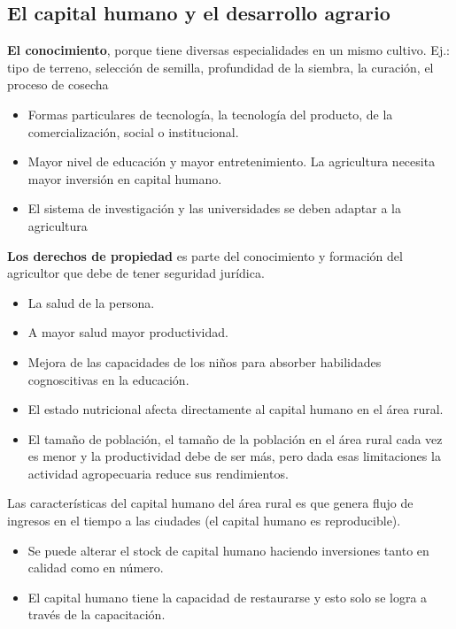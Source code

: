 \documentclass[
  letterpaper,
  DIV=11,
  numbers=noendperiod]{scrartcl}
\begin{document}
\hypertarget{el-capital-humano-y-el-desarrollo-agrario}{%
\subsection{El capital humano y el desarrollo
agrario}\label{el-capital-humano-y-el-desarrollo-agrario}}

\textbf{El conocimiento}, porque tiene diversas especialidades en un
mismo cultivo. Ej.: tipo de terreno, selección de semilla, profundidad
de la siembra, la curación, el proceso de cosecha

\begin{itemize}
\item
  Formas particulares de tecnología, la tecnología del producto, de la
  comercialización, social o institucional.
\item
  Mayor nivel de educación y mayor entretenimiento. La agricultura
  necesita mayor inversión en capital humano.
\item
  El sistema de investigación y las universidades se deben adaptar a la
  agricultura
\end{itemize}

\textbf{Los derechos de propiedad} es parte del conocimiento y formación
del agricultor que debe de tener seguridad jurídica.

\begin{itemize}
\item
  La salud de la persona.
\item
  A mayor salud mayor productividad.
\item
  Mejora de las capacidades de los niños para absorber habilidades
  cognoscitivas en la educación.
\item
  El estado nutricional afecta directamente al capital humano en el área
  rural.
\item
  El tamaño de población, el tamaño de la población en el área rural
  cada vez es menor y la productividad debe de ser más, pero dada esas
  limitaciones la actividad agropecuaria reduce sus rendimientos.
\end{itemize}

Las características del capital humano del área rural es que genera
flujo de ingresos en el tiempo a las ciudades (el capital humano es
reproducible).

\begin{itemize}
\item
  Se puede alterar el stock de capital humano haciendo inversiones tanto
  en calidad como en número.
\item
  El capital humano tiene la capacidad de restaurarse y esto solo se
  logra a través de la capacitación.
\end{itemize}
\end{document}
